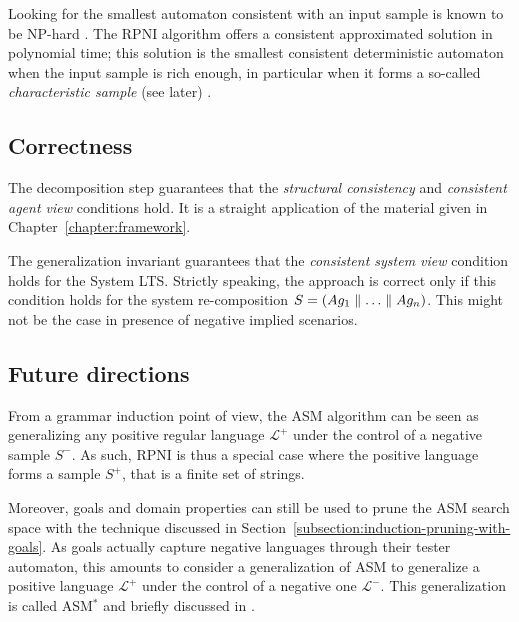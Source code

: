 Looking for the smallest automaton consistent with an input sample is known to be NP-hard \cite{Gold:1978, Angluin:1978}. The RPNI algorithm offers a consistent approximated solution in polynomial time; this solution is the smallest consistent deterministic automaton when the input sample is rich enough, in particular when it forms a so-called \emph{characteristic sample} (see later) \cite{Oncina:1992}.

\subsection{Correctness}

The decomposition step guarantees that the \emph{structural consistency} and \emph{consistent agent view} conditions hold. It is a straight application of the material given in Chapter~\ref{chapter:framework}. 

The generalization invariant guarantees that the \emph{consistent system view} condition holds for the System LTS. Strictly speaking, the approach is correct only if this condition holds for the system re-composition $S = (Ag_1 \parallel \ldots \parallel Ag_n)$. This might not be the case in presence of negative implied scenarios.

\subsection{Future directions}

From a grammar induction point of view, the ASM algorithm can be seen as generalizing any positive regular language $\mathcal{L}^+$ under the control of a negative sample $S^-$. As such, RPNI is thus a special case where the positive language forms a sample $S^+$, that is a finite set of strings.

Moreover, goals and domain properties can still be used to prune the ASM search space with the technique discussed in Section~\ref{subsection:induction-pruning-with-goals}. As goals actually capture negative languages through their tester automaton, this amounts to consider a generalization of ASM to generalize a positive language $\mathcal{L}^+$ under the control of a negative one $\mathcal{L}^-$. This generalization is called ASM$^*$ and briefly discussed in \cite{Lambeau:2008}.
